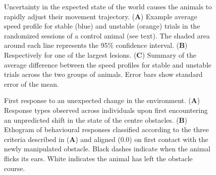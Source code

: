 \begin{figure}
\centering

\caption{Uncertainty in the expected state of the world causes the animals to rapidly adjust their movement trajectory. (\textbf{A}) Example average speed profile for stable (blue) and unstable (orange) trials in the randomized sessions of a control animal (see text). The shaded area around each line represents the 95\% confidence interval. (\textbf{B}) Respectively for one of the largest lesions. (\textbf{C}) Summary of the average difference between the speed profiles for stable and unstable trials across the two groups of animals. Error bars show standard error of the mean.}
\label{fig:speed}
\end{figure}

\begin{figure}
\centering

\caption{First response to an unexpected change in the environment. (\textbf{A}) Response types observed across individuals upon first encountering an unpredicted shift in the state of the centre obstacles. (\textbf{B}) Ethogram of behavioural responses classified according to the three criteria described in (\textbf{A}) and aligned (0.0) on first contact with the newly manipulated obstacle. Black dashes indicate when the animal flicks its ears. White indicates the animal has left the obstacle course.}
\label{fig:ethogram}
\end{figure}

